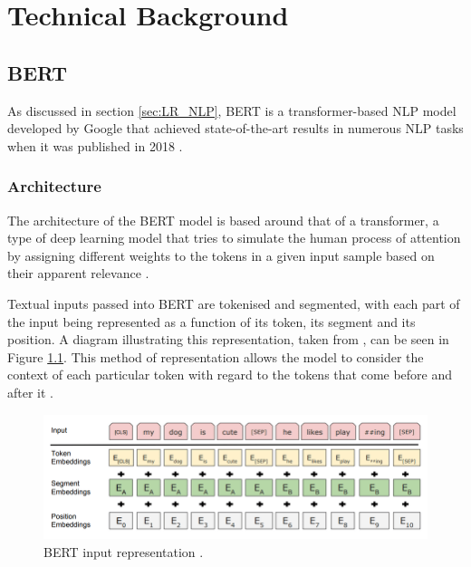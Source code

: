 \chapter{Technical Background}

\section{BERT}

As discussed in section \ref{sec:LR_NLP}, BERT is a transformer-based NLP model developed by Google that achieved state-of-the-art results in numerous NLP tasks when it was published in 2018 \cite{Devlin2018_BERT}.

\subsection{Architecture}

The architecture of the BERT model is based around that of a transformer, a type of deep learning model that tries to simulate the human process of attention by assigning different weights to the tokens in a given input sample based on their apparent relevance \cite{Bahdanau2014_Attention} \cite{sabharwal2021bert}.

Textual inputs passed into BERT are tokenised and segmented, with each part of the input being represented as a function of its token, its segment and its position. A diagram illustrating this representation, taken from \cite{Devlin2018_BERT}, can be seen in Figure \ref{fig:Explain_BERTEmbeddings}. This method of representation allows the model to consider the context of each particular token with regard to the tokens that come before and after it \cite{sabharwal2021bert}.

\begin{figure}[ht]
    \centering
    \includegraphics[scale=0.5]{figures/99_explanations/02_BERTEmbeddings.png}
    \caption{BERT input representation \cite{Devlin2018_BERT}.}
    \label{fig:Explain_BERTEmbeddings}
\end{figure}

